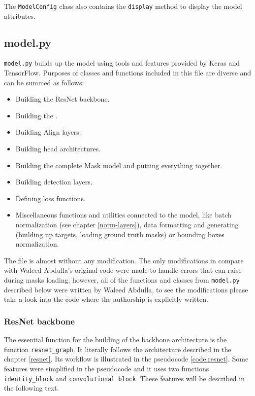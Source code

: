 The \verb|ModelConfig| class also contains the \verb|display| method to display the model attributes.

\subsection{model.py}
\label{model}

\verb|model.py| builds up the model using tools and features provided by Keras and TensorFlow. Purposes of classes and functions included in this file are diverse and can be summed as follows:
\begin{itemize}
	\item Building the ResNet backbone.
	\item Building the .
	\item Building Align layers.
	\item Building head architectures.
	\item Building the complete Mask  model and putting everything together.
	\item Building detection layers.
	\item Defining loss functions.
	\item Miscellaneous functions and utilities connected to the model, like batch normalization (see chapter \ref{norm-layers}), data formatting and generating (building up targets, loading ground truth masks) or bounding boxes normalization.
\end{itemize}

The file is almost without any modification. The only modifications in compare with Waleed Abdulla's original code were made to handle errors that can raise during masks loading; however, all of the functions and classes from \verb|model.py| described below were written by Waleed Abdulla, to see the modifications please take a look into the code where the authorship is explicitly written.

\subsubsection{ResNet backbone}
\label{model-resnet}

The essential function for the building of the backbone architecture is the function \verb|resnet_graph|. It literally follows the architecture described in the chapter \ref{resnet}. Its workflow is illustrated in the pseudocode \ref{code:resnet}. Some features were simplified in the pseudocode and it uses two functions \verb|identity_block| and \verb|convolutional block|. These features will be described in the following text.


